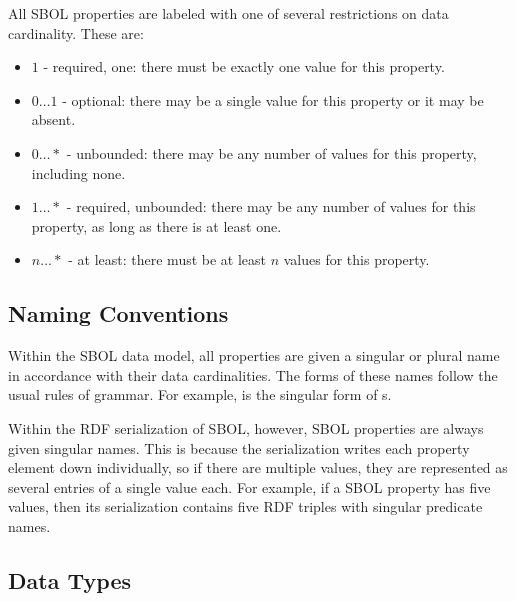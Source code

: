All SBOL properties are labeled with one of several restrictions on data cardinality. These are:

\begin{itemize}

\item $1$ - required, one: there must be exactly one value for this property.

\item $0 \ldots 1$ - optional: there may be a single value for this property or it may be absent.

\item $0 \ldots *$ - unbounded: there may be any number of values for this property, including none.

\item $1 \ldots *$ - required, unbounded: there may be any number of values for this property, as long as there is at least one.

\item $n \ldots *$ - at least: there must be at least $n$ values for this property.

\end{itemize}

\subsection{Naming Conventions}


Within the SBOL data model, all properties are given a singular or plural name in accordance with their data cardinalities. The forms of these names follow the usual rules of grammar. For example,  is the singular form of s.



Within the RDF serialization of SBOL, however, SBOL properties are always given singular names. This is because the serialization writes each property element down individually, so if there are multiple values, they are represented as several entries of a single value each.
For example, if a SBOL property has five values, then its serialization contains five RDF triples with singular predicate names.

\subsection{Data Types}


